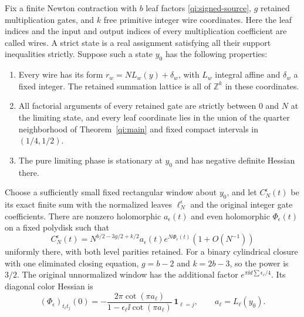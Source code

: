 \begin{corollary}\label{qi:window}
Fix a finite Newton contraction with $b$ leaf factors
\eqref{qi:signed-source}, $g$ retained multiplication gates, and $k$ free primitive integer wire coordinates. Here the leaf indices and the input and output indices of every
multiplication coefficient are called wires. A strict state is a real
assignment satisfying all their support inequalities strictly. Suppose
such a state $y_0$ has the following properties:
\begin{enumerate}
 \item Every wire has its form $r_w=NL_w(y)+\delta_w$, with $L_w$ integral affine and $\delta_w$ a fixed integer. The retained summation lattice is all of $\mathbb Z^k$ in these coordinates.
 \item All factorial arguments of every retained gate are strictly between $0$ and $N$ at the limiting state, and every leaf coordinate lies in the union of the quarter neighborhood of Theorem~\ref{qi:main} and fixed compact intervals in $(1/4,1/2)$.
 \item The pure limiting phase is stationary at $y_0$ and has negative definite Hessian there.
\end{enumerate}
Choose a sufficiently small fixed rectangular window about $y_0$, and let $C_N^\epsilon(t)$ be its exact finite sum with the normalized leaves $\ell_N^\epsilon$ and the original integer gate coefficients. There are nonzero holomorphic $a_\epsilon(t)$ and even holomorphic $\Phi_\epsilon(t)$ on a fixed polydisk such that
\begin{equation}\label{qi:window-asymptotic}
 C_N^\epsilon(t)=
 N^{b/2-3g/2+k/2}a_\epsilon(t)e^{N\Phi_\epsilon(t)}
                         (1+O(N^{-1}))
\end{equation}
uniformly there, with both level parities retained. For a binary cylindrical closure with one eliminated closing equation, $g=b-2$ and $k=2b-3$, so the power is $3/2$. The original unnormalized window has the additional factor
$e^{\pi\ii d\sum\epsilon_\ell/4}$.
Its diagonal color Hessian is
\[
 (\Phi_\epsilon)_{t_\ell t_j}(0)=
 -\frac{2\pi\cot(\pi a_\ell)}
       {1-\epsilon_\ell\ii\cot(\pi a_\ell)}\,
       \mathbf1_{\ell=j},
 \qquad a_\ell=L_\ell(y_0).
\]
\end{corollary}

